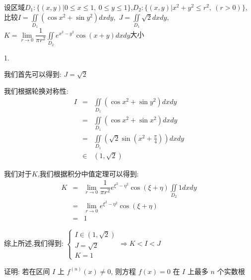 \begin{example}[][Exam: 35.2.11]
	设区域$D_{1}:\{(x,y)| 0\leq x\leq 1,\ 0\leq y\leq 1\}$,$D_{2}:\{(x,y)| x^2+y^2\leq r^2,\ (r>0)\}$,比较$I=\iint \limits_{D_{1}}\left(\cos x^2+\sin y^2\right) dxdy$,\ $J=\iint\limits_{D_{1}}\sqrt{2}dxdy$,\ $K=\lim\limits_{r\to 0}\dfrac{1}{\pi r^2}\iint\limits_{D_{2}}e^{x^2-y^2}\cos(x+y)dxdy$大小
\end{example}
1. 
\begin{solution}

	我们首先可以得到:  $J=\sqrt{2}$
	
	我们根据轮换对称性:  
	\begin{eqnarray*}
		I&=&\iint \limits_{D_{1}}\left(\cos x^2+\sin y^2\right) dxdy\\
		&=&\iint \limits_{D_{1}}\left(\cos x^2+\sin x^2\right) dxdy\\
		&=&\iint \limits_{D_{1}}\left(\sqrt{2}\sin(x^2+\frac{\pi}{4})\right)dxdy\\
		&\in&(1,\sqrt{2})
	\end{eqnarray*}

	我们对于$K$,我们根据积分中值定理可以得到:  
	\begin{eqnarray*}
		K&=&\lim\limits_{r\to 0}\dfrac{1}{\pi r^2}e^{\xi^2-\eta^2}\cos(\xi+\eta)\iint\limits_{D_{2}}1dxdy\\
		&=&\lim\limits_{r\to 0}e^{\xi^2-\eta^2}\cos(\xi+\eta)\\
		&=&1
	\end{eqnarray*}

	综上所述,我们得到:  $\left\lbrace
	\begin{array}{l}
		I\in(1,\sqrt{2})\\
		J=\sqrt{2}\\
		K=1
	\end{array}
	\right.\Rightarrow K<I<J$
\end{solution}

\begin{example}[][Exam: 35.2.12]
	证明: 若在区间 $I$ 上 $f^{(n)}(x)\neq 0$, 则方程 $f(x)=0$ 在 $I$ 上最多 $n$ 个实数根
\end{example}

